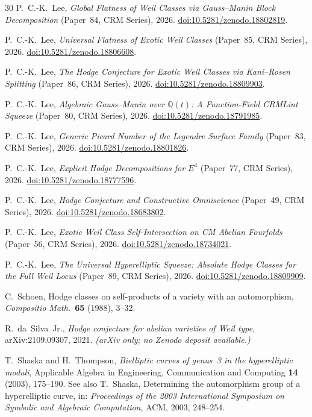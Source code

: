 \documentclass[11pt]{article}
\theoremstyle{plain}
\theoremstyle{definition}
\theoremstyle{remark}
\newcommand{\Q}{\mathbb{Q}}
\begin{document}
\begin{thebibliography}{30}
P.~C.-K.~Lee,
\emph{Global Flatness of Weil Classes via Gauss--Manin Block
Decomposition} (Paper~84, CRM Series),
2026.
\href{https://doi.org/10.5281/zenodo.18802819}{doi:10.5281/zenodo.18802819}.

P.~C.-K.~Lee,
\emph{Universal Flatness of Exotic Weil Classes} (Paper~85, CRM Series),
2026.
\href{https://doi.org/10.5281/zenodo.18806608}{doi:10.5281/zenodo.18806608}.

P.~C.-K.~Lee,
\emph{The Hodge Conjecture for Exotic Weil Classes via Kani--Rosen
Splitting} (Paper~86, CRM Series),
2026.
\href{https://doi.org/10.5281/zenodo.18809903}{doi:10.5281/zenodo.18809903}.

P.~C.-K.~Lee,
\emph{Algebraic Gauss--Manin over $\Q(t)$: A Function-Field
CRMLint Squeeze} (Paper~80, CRM Series),
2026.
\href{https://doi.org/10.5281/zenodo.18791985}{doi:10.5281/zenodo.18791985}.

P.~C.-K.~Lee,
\emph{Generic Picard Number of the Legendre Surface Family}
(Paper~83, CRM Series),
2026.
\href{https://doi.org/10.5281/zenodo.18801826}{doi:10.5281/zenodo.18801826}.

P.~C.-K.~Lee,
\emph{Explicit Hodge Decompositions for $E^4$} (Paper~77, CRM Series),
2026.
\href{https://doi.org/10.5281/zenodo.18777596}{doi:10.5281/zenodo.18777596}.

P.~C.-K.~Lee,
\emph{Hodge Conjecture and Constructive Omniscience}
(Paper~49, CRM Series),
2026.
\href{https://doi.org/10.5281/zenodo.18683802}{doi:10.5281/zenodo.18683802}.

P.~C.-K.~Lee,
\emph{Exotic Weil Class Self-Intersection on CM Abelian Fourfolds}
(Paper~56, CRM Series),
2026.
\href{https://doi.org/10.5281/zenodo.18734021}{doi:10.5281/zenodo.18734021}.

P.~C.-K.~Lee,
\emph{The Universal Hyperelliptic Squeeze: Absolute Hodge Classes
for the Full Weil Locus} (Paper~89, CRM Series),
2026.
\href{https://doi.org/10.5281/zenodo.18809909}{doi:10.5281/zenodo.18809909}.

C.~Schoen,
Hodge classes on self-products of a variety with an automorphism,
\emph{Compositio Math.}\ \textbf{65} (1988), 3--32.

R.~da~Silva~Jr.,
\emph{Hodge conjecture for abelian varieties of Weil type},
arXiv:2109.09307, 2021.
\textit{(arXiv only; no Zenodo deposit available.)}

T.~Shaska and H.~Thompson,
\emph{Bielliptic curves of genus~3 in the hyperelliptic moduli},
Applicable Algebra in Engineering, Communication and Computing
\textbf{14} (2003), 175--190.
See also T.~Shaska, Determining the automorphism group of
a hyperelliptic curve, in: \emph{Proceedings of the 2003
International Symposium on Symbolic and Algebraic
Computation}, ACM, 2003, 248--254.


\end{thebibliography}
\end{document}
